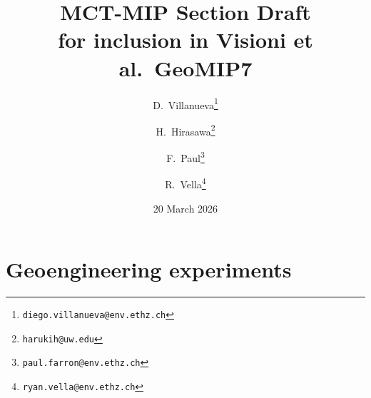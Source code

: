 \documentclass[12pt,a4paper]{article}
\title{MCT-MIP Section Draft\\
       \large for inclusion in Visioni et al.\ GeoMIP7}
\author{D.\ Villanueva\thanks{\texttt{diego.villanueva@env.ethz.ch}} \and
        H.\ Hirasawa\thanks{\texttt{harukih@uw.edu}} \and
        F.\ Paul\thanks{\texttt{paul.farron@env.ethz.ch}} \and
        R.\ Vella\thanks{\texttt{ryan.vella@env.ethz.ch}}}
\date{20 March 2026}
\begin{document}
\maketitle

\section{Geoengineering experiments}




\end{document}
